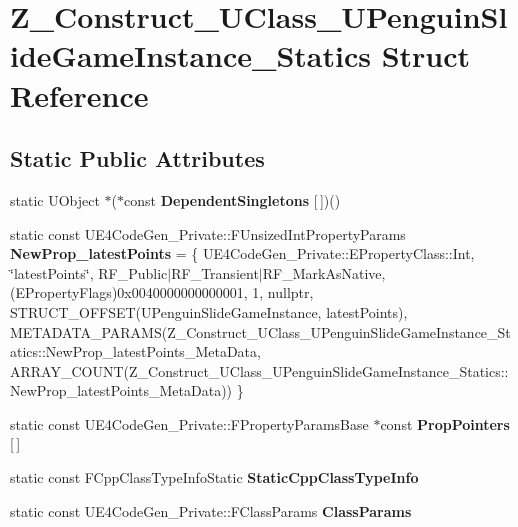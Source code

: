 \hypertarget{struct_z___construct___u_class___u_penguin_slide_game_instance___statics}{}\section{Z\+\_\+\+Construct\+\_\+\+U\+Class\+\_\+\+U\+Penguin\+Slide\+Game\+Instance\+\_\+\+Statics Struct Reference}
\label{struct_z___construct___u_class___u_penguin_slide_game_instance___statics}
\subsection*{Static Public Attributes}
\begin{DoxyCompactItemize}
\item 
\mbox{\label{struct_z___construct___u_class___u_penguin_slide_game_instance___statics_a1f826d45acbe3770779edac65b0451ab}} 
static U\+Object $\ast$($\ast$const {\bfseries Dependent\+Singletons} \mbox{[}$\,$\mbox{]})()
\item 
\mbox{\label{struct_z___construct___u_class___u_penguin_slide_game_instance___statics_ade082d0b06c68caf3e6ed3acabe3e7f8}} 
static const U\+E4\+Code\+Gen\+\_\+\+Private\+::\+F\+Unsized\+Int\+Property\+Params {\bfseries New\+Prop\+\_\+latest\+Points} = \{ U\+E4\+Code\+Gen\+\_\+\+Private\+::\+E\+Property\+Class\+::\+Int, \char`\"{}latest\+Points\char`\"{}, R\+F\+\_\+\+Public$\vert$R\+F\+\_\+\+Transient$\vert$R\+F\+\_\+\+Mark\+As\+Native, (E\+Property\+Flags)0x0040000000000001, 1, nullptr, S\+T\+R\+U\+C\+T\+\_\+\+O\+F\+F\+S\+E\+T(\+U\+Penguin\+Slide\+Game\+Instance, latest\+Points), M\+E\+T\+A\+D\+A\+T\+A\+\_\+\+P\+A\+R\+A\+M\+S(\+Z\+\_\+\+Construct\+\_\+\+U\+Class\+\_\+\+U\+Penguin\+Slide\+Game\+Instance\+\_\+\+Statics\+::\+New\+Prop\+\_\+latest\+Points\+\_\+\+Meta\+Data, A\+R\+R\+A\+Y\+\_\+\+C\+O\+U\+N\+T(\+Z\+\_\+\+Construct\+\_\+\+U\+Class\+\_\+\+U\+Penguin\+Slide\+Game\+Instance\+\_\+\+Statics\+::\+New\+Prop\+\_\+latest\+Points\+\_\+\+Meta\+Data)) \}
\item 
static const U\+E4\+Code\+Gen\+\_\+\+Private\+::\+F\+Property\+Params\+Base $\ast$const {\bfseries Prop\+Pointers} \mbox{[}$\,$\mbox{]}
\item 
static const F\+Cpp\+Class\+Type\+Info\+Static {\bfseries Static\+Cpp\+Class\+Type\+Info}
\item 
static const U\+E4\+Code\+Gen\+\_\+\+Private\+::\+F\+Class\+Params {\bfseries Class\+Params}
\end{DoxyCompactItemize}


